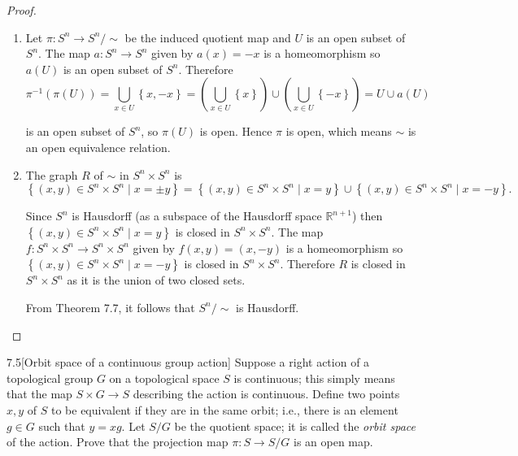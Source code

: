 \begin{proof}
	\begin{enumerate}[label={(\alph*)},leftmargin=*]
		\item Let \( \pi: S^{n} \to S^{n}/\!\sim \) be the induced quotient map and \( U \) is an open subset of \( S^{n} \). The map \( a: S^{n} \to S^{n} \) given by \( a(x) = -x \) is a homeomorphism so \( a(U) \) is an open subset of \( S^{n} \). Therefore
		      \[
			      \pi^{-1}(\pi(U)) = \bigcup_{x\in U} \left\{ x, -x \right\} = \left(\bigcup_{x\in U} \left\{ x \right\}\right) \cup \left( \bigcup_{x\in U} \left\{ -x \right\} \right) = U \cup a(U)
		      \]

		      is an open subset of \( S^{n} \), so \( \pi(U) \) is open. Hence \( \pi \) is open, which means \( \sim \) is an open equivalence relation.
		\item The graph \( R \) of \( \sim \) in \( S^{n} \times S^{n} \) is
		      \[
			      \left\{ (x, y) \in S^{n}\times S^{n} \mid x = \pm y \right\} = \left\{ (x, y) \in S^{n}\times S^{n} \mid x = y \right\} \cup \left\{ (x, y) \in S^{n}\times S^{n} \mid x = -y \right\}.
		      \]

		      Since \( S^{n} \) is Hausdorff (as a subspace of the Hausdorff space \( \mathbb{R}^{n+1} \)) then \( \left\{ (x, y) \in S^{n}\times S^{n} \mid x = y \right\} \) is closed in \( S^{n} \times S^{n} \). The map \( f: S^{n} \times S^{n} \to S^{n} \times S^{n} \) given by \( f(x, y) = (x, -y) \) is a homeomorphism so \( \left\{ (x, y) \in S^{n}\times S^{n} \mid x = -y \right\} \) is closed in \( S^{n} \times S^{n} \). Therefore \( R \) is closed in \( S^{n} \times S^{n} \) as it is the union of two closed sets.

		      From Theorem 7.7, it follows that \( S^{n}/\!\sim \) is Hausdorff.
	\end{enumerate}
\end{proof}

\begin{problem}{7.5}[Orbit space of a continuous group action]\label{problem:7.5}
Suppose a right action of a topological group \(G\) on a topological space \(S\) is continuous; this simply means that the map \( S\times G \to S \) describing the action is continuous. Define two points \( x,y \) of \(S\) to be equivalent if they are in the same orbit; i.e., there is an element \( g\in G \) such that \( y = xg \). Let \( S/G \) be the quotient space; it is called the \textit{orbit space} of the action. Prove that the projection map \( \pi: S \to S/G \) is an open map.
\end{problem}

